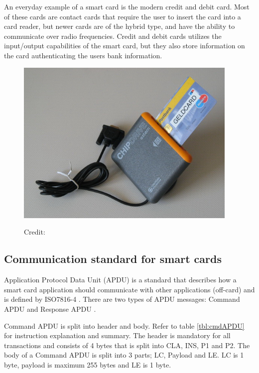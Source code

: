 An everyday example of a smart card is the modern credit and debit card. Most of these cards are contact cards that require the user to insert the card into a card reader, but newer cards are of the hybrid type, and have the ability to communicate over radio frequencies. Credit and debit cards utilizes the input/output capabilities of the smart card, but they also store information on the card authenticating the users bank information.

\begin{figure}[h!]

  \centering
  \includegraphics[width=0.95\textwidth]{images/chipdrive.jpg}
  \begin{flushright}
  \hspace*{15pt}\hbox{\scriptsize Credit:}
\end{flushright}
  \label{fig:nfccard}
\end{figure}

\subsection{Communication standard for smart cards}
\label{sec:communicationstandard}
Application Protocol Data Unit (APDU) is a standard that describes how a smart card application should communicate with other applications (off-card) and is defined by ISO7816-4 \cite{iso7816-4}. There are two types of APDU messages: Command APDU and Response APDU \cite[~Ch. 8.3, Message Structure: APDUS]{smartcardHandbook}.

Command APDU is split into header and body. Refer to table \ref{tbl:cmdAPDU} for instruction explanation and summary. The header is mandatory for all transactions and consists of 4 bytes that is split into CLA, INS, P1 and P2. The body of a Command APDU is split into 3 parts; LC, Payload and LE. LC is 1 byte, payload is maximum 255 bytes and LE is 1 byte.

